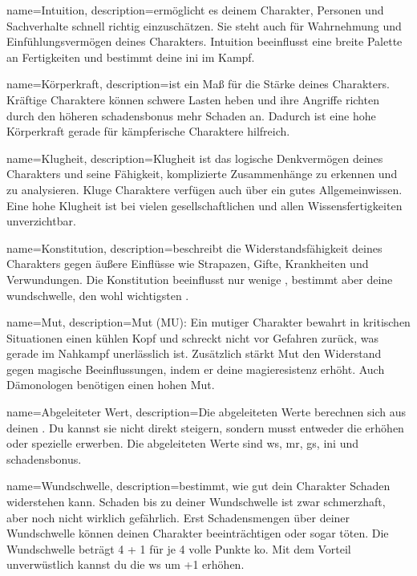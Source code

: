 {
    name={Intuition},
    description={ermöglicht es deinem Charakter, Personen und Sachverhalte schnell richtig einzuschätzen. Sie steht auch für Wahrnehmung und Einfühlungsvermögen deines Charakters. Intuition beeinflusst eine breite Palette an Fertigkeiten und bestimmt deine \gls{ini} im Kampf.}}

{
    name={Körperkraft},
    description={ist ein Maß für die Stärke deines Charakters. Kräftige Charaktere können schwere Lasten heben und ihre Angriffe richten durch den höheren \gls{schadensbonus} mehr Schaden an. Dadurch ist eine hohe Körperkraft gerade für kämpferische Charaktere hilfreich.}}

{
    name={Klugheit},
    description={Klugheit ist das logische Denkvermögen deines Charakters und seine Fähigkeit, komplizierte Zusammenhänge zu erkennen und zu analysieren. Kluge Charaktere verfügen auch über ein gutes Allgemeinwissen. Eine hohe Klugheit ist bei vielen gesellschaftlichen und allen Wissensfertigkeiten unverzichtbar.}}

{
    name={Konstitution},
    description={beschreibt die Widerstandsfähigkeit deines Charakters gegen äußere Einflüsse wie Strapazen, Gifte, Krankheiten und Verwundungen. Die Konstitution beeinflusst nur wenige , bestimmt aber deine \gls{wundschwelle}, den wohl wichtigsten .}}

{
    name={Mut},
    description={Mut (MU): Ein mutiger Charakter bewahrt in kritischen Situationen einen kühlen Kopf und schreckt nicht vor Gefahren zurück, was gerade im Nahkampf unerlässlich ist. Zusätzlich stärkt Mut den Widerstand gegen magische Beeinflussungen, indem er deine \gls{magieresistenz} erhöht. Auch Dämonologen benötigen einen hohen Mut.}}

{
    name={Abgeleiteter Wert},
    description={Die abgeleiteten Werte berechnen sich aus deinen .
Du kannst sie nicht direkt steigern, sondern musst entweder die  erhöhen oder spezielle  erwerben. Die abgeleiteten Werte sind \gls{ws}, \gls{mr}, \gls{gs}, \gls{ini} und \gls{schadensbonus}.}}

{
    name={Wundschwelle},
    description={bestimmt, wie gut dein Charakter Schaden widerstehen kann. Schaden bis zu deiner Wundschwelle ist zwar schmerzhaft, aber noch nicht wirklich gefährlich. Erst Schadensmengen über deiner Wundschwelle können deinen Charakter beeinträchtigen oder sogar töten. Die Wundschwelle beträgt 4 + 1 für je 4 volle Punkte \gls{ko}. Mit dem Vorteil \gls{unverwüstlich} kannst du die \gls{ws} um +1 erhöhen.}}

